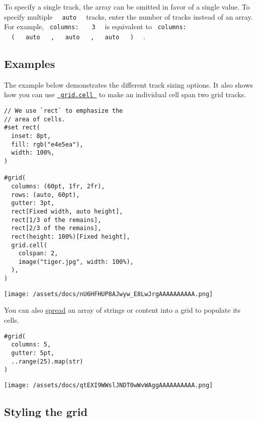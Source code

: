 To specify a single track, the array can be omitted in favor of a single
value. To specify multiple \texttt{\ }{\texttt{\ auto\ }}\texttt{\ }
tracks, enter the number of tracks instead of an array. For example,
\texttt{\ columns:\ } \texttt{\ }{\texttt{\ 3\ }}\texttt{\ } is
equivalent to \texttt{\ columns:\ }
\texttt{\ }{\texttt{\ (\ }}\texttt{\ }{\texttt{\ auto\ }}\texttt{\ }{\texttt{\ ,\ }}\texttt{\ }{\texttt{\ auto\ }}\texttt{\ }{\texttt{\ ,\ }}\texttt{\ }{\texttt{\ auto\ }}\texttt{\ }{\texttt{\ )\ }}\texttt{\ }
.

\subsection{Examples}\label{examples}

The example below demonstrates the different track sizing options. It
also shows how you can use
\href{/docs/reference/layout/grid/\#definitions-cell}{\texttt{\ grid.cell\ }}
to make an individual cell span two grid tracks.

\begin{verbatim}
// We use `rect` to emphasize the
// area of cells.
#set rect(
  inset: 8pt,
  fill: rgb("e4e5ea"),
  width: 100%,
)

#grid(
  columns: (60pt, 1fr, 2fr),
  rows: (auto, 60pt),
  gutter: 3pt,
  rect[Fixed width, auto height],
  rect[1/3 of the remains],
  rect[2/3 of the remains],
  rect(height: 100%)[Fixed height],
  grid.cell(
    colspan: 2,
    image("tiger.jpg", width: 100%),
  ),
)
\end{verbatim}

\texttt{[image: /assets/docs/nU6HFHUP8AJwyw\_E8LwJrgAAAAAAAAAA.png]}

You can also
\href{/docs/reference/foundations/arguments/\#spreading}{spread} an
array of strings or content into a grid to populate its cells.

\begin{verbatim}
#grid(
  columns: 5,
  gutter: 5pt,
  ..range(25).map(str)
)
\end{verbatim}

\texttt{[image: /assets/docs/qtEXI9WWslJNDT0wWvWAggAAAAAAAAAA.png]}

\subsection{Styling the grid}\label{styling-the-grid}

